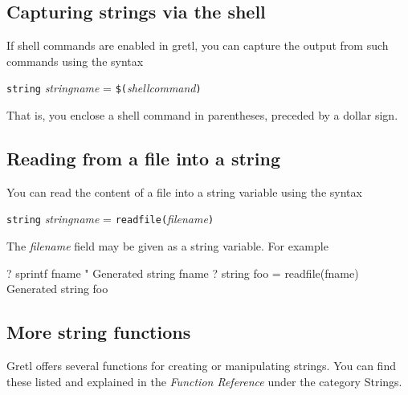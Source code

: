 \subsection{Capturing strings via the shell}

If shell commands are enabled in gretl, you can capture the
output from such commands using the syntax 

\texttt{string} \textsl{stringname} = \texttt{\$(}\textsl{shellcommand}\texttt{)}

That is, you enclose a shell command in parentheses, preceded by
a dollar sign.

\subsection{Reading from a file into a string}

You can read the content of a file into a string variable using
the syntax

\texttt{string} \textsl{stringname} = \texttt{readfile(}\textsl{filename}\texttt{)}

The \textsl{filename} field may be given as a string variable.  For
example
%
\begin{code}
? sprintf fname "%
Generated string fname
? string foo = readfile(fname)
Generated string foo
\end{code}

\subsection{More string functions}

Gretl offers several functions for creating or manipulating
strings. You can find these listed and explained in the
\textit{Function Reference} under the category \textsf{Strings}.
    

